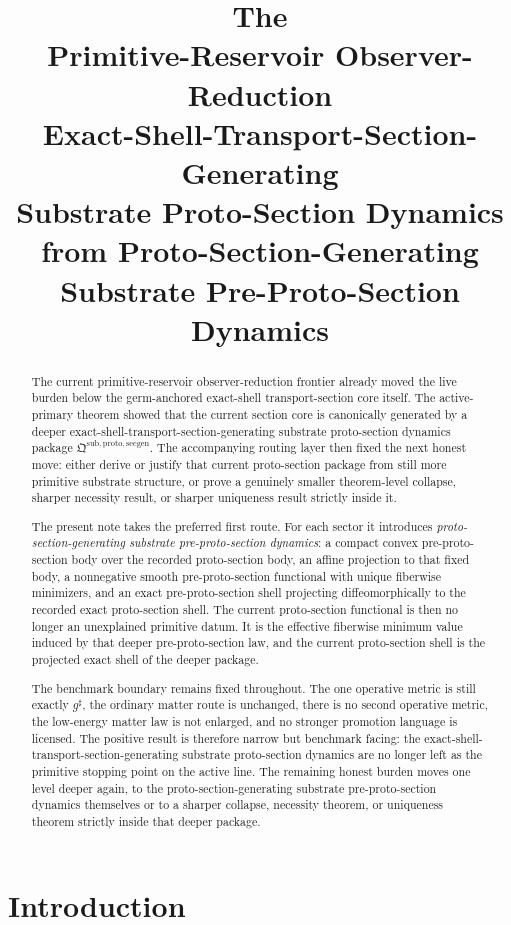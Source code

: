 \documentclass[11pt]{article}
\title{\textbf{The \TheoryName{}}\\[0.4em]
\large Primitive-Reservoir Observer-Reduction\\
\large Exact-Shell-Transport-Section-Generating\\
\large Substrate Proto-Section Dynamics\\
\large from Proto-Section-Generating Substrate Pre-Proto-Section Dynamics}
\author{}
\date{}
\newcommand{\CompletedMetric}{g^{\sharp}}
\newcommand{\ProtoSectionPackage}{\mathfrak Q^{\mathrm{sub,proto,secgen}}}
\begin{document}
\maketitle

\begin{abstract}
The current primitive-reservoir observer-reduction frontier already moved the live burden below the germ-anchored exact-shell transport-section core itself. The active-primary theorem showed that the current section core is canonically generated by a deeper exact-shell-transport-section-generating substrate proto-section dynamics package \(\ProtoSectionPackage\). The accompanying routing layer then fixed the next honest move: either derive or justify that current proto-section package from still more primitive substrate structure, or prove a genuinely smaller theorem-level collapse, sharper necessity result, or sharper uniqueness result strictly inside it.

The present note takes the preferred first route. For each sector it introduces \emph{proto-section-generating substrate pre-proto-section dynamics}: a compact convex pre-proto-section body over the recorded proto-section body, an affine projection to that fixed body, a nonnegative smooth pre-proto-section functional with unique fiberwise minimizers, and an exact pre-proto-section shell projecting diffeomorphically to the recorded exact proto-section shell. The current proto-section functional is then no longer an unexplained primitive datum. It is the effective fiberwise minimum value induced by that deeper pre-proto-section law, and the current proto-section shell is the projected exact shell of the deeper package.

The benchmark boundary remains fixed throughout. The one operative metric is still exactly \(\CompletedMetric\), the ordinary matter route is unchanged, there is no second operative metric, the low-energy matter law is not enlarged, and no stronger promotion language is licensed. The positive result is therefore narrow but benchmark facing: the exact-shell-transport-section-generating substrate proto-section dynamics are no longer left as the primitive stopping point on the active line. The remaining honest burden moves one level deeper again, to the proto-section-generating substrate pre-proto-section dynamics themselves or to a sharper collapse, necessity theorem, or uniqueness theorem strictly inside that deeper package.
\end{abstract}

\section{Introduction}
\end{document}
